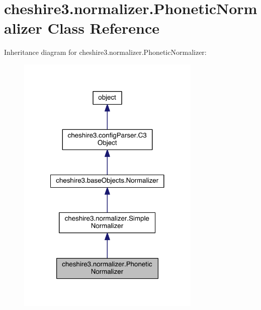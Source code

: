 \hypertarget{classcheshire3_1_1normalizer_1_1_phonetic_normalizer}{\section{cheshire3.\-normalizer.\-Phonetic\-Normalizer Class Reference}
\label{classcheshire3_1_1normalizer_1_1_phonetic_normalizer}
}


Inheritance diagram for cheshire3.\-normalizer.\-Phonetic\-Normalizer\-:
\nopagebreak
\begin{figure}[H]
\begin{center}
\leavevmode
\includegraphics[width=248pt]{classcheshire3_1_1normalizer_1_1_phonetic_normalizer__inherit__graph}
\end{center}
\end{figure}


